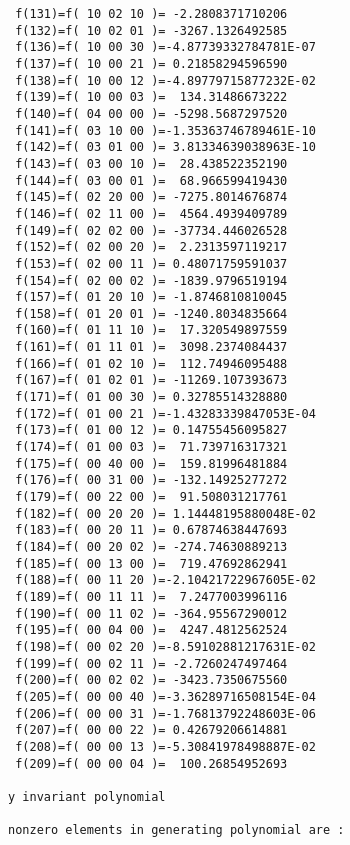 \begin{footnotesize}
\begin{verbatim}
 f(131)=f( 10 02 10 )= -2.2808371710206
 f(132)=f( 10 02 01 )= -3267.1326492585
 f(136)=f( 10 00 30 )=-4.87739332784781E-07
 f(137)=f( 10 00 21 )= 0.21858294596590
 f(138)=f( 10 00 12 )=-4.89779715877232E-02
 f(139)=f( 10 00 03 )=  134.31486673222
 f(140)=f( 04 00 00 )= -5298.5687297520
 f(141)=f( 03 10 00 )=-1.35363746789461E-10
 f(142)=f( 03 01 00 )= 3.81334639038963E-10
 f(143)=f( 03 00 10 )=  28.438522352190
 f(144)=f( 03 00 01 )=  68.966599419430
 f(145)=f( 02 20 00 )= -7275.8014676874
 f(146)=f( 02 11 00 )=  4564.4939409789
 f(149)=f( 02 02 00 )= -37734.446026528
 f(152)=f( 02 00 20 )=  2.2313597119217
 f(153)=f( 02 00 11 )= 0.48071759591037
 f(154)=f( 02 00 02 )= -1839.9796519194
 f(157)=f( 01 20 10 )= -1.8746810810045
 f(158)=f( 01 20 01 )= -1240.8034835664
 f(160)=f( 01 11 10 )=  17.320549897559
 f(161)=f( 01 11 01 )=  3098.2374084437
 f(166)=f( 01 02 10 )=  112.74946095488
 f(167)=f( 01 02 01 )= -11269.107393673
 f(171)=f( 01 00 30 )= 0.32785514328880
 f(172)=f( 01 00 21 )=-1.43283339847053E-04
 f(173)=f( 01 00 12 )= 0.14755456095827
 f(174)=f( 01 00 03 )=  71.739716317321
 f(175)=f( 00 40 00 )=  159.81996481884
 f(176)=f( 00 31 00 )= -132.14925277272
 f(179)=f( 00 22 00 )=  91.508031217761
 f(182)=f( 00 20 20 )= 1.14448195880048E-02
 f(183)=f( 00 20 11 )= 0.67874638447693
 f(184)=f( 00 20 02 )= -274.74630889213
 f(185)=f( 00 13 00 )=  719.47692862941
 f(188)=f( 00 11 20 )=-2.10421722967605E-02
 f(189)=f( 00 11 11 )=  7.2477003996116
 f(190)=f( 00 11 02 )= -364.95567290012
 f(195)=f( 00 04 00 )=  4247.4812562524
 f(198)=f( 00 02 20 )=-8.59102881217631E-02
 f(199)=f( 00 02 11 )= -2.7260247497464
 f(200)=f( 00 02 02 )= -3423.7350675560
 f(205)=f( 00 00 40 )=-3.36289716508154E-04
 f(206)=f( 00 00 31 )=-1.76813792248603E-06
 f(207)=f( 00 00 22 )= 0.42679206614881
 f(208)=f( 00 00 13 )=-5.30841978498887E-02
 f(209)=f( 00 00 04 )=  100.26854952693

y invariant polynomial

nonzero elements in generating polynomial are :


\end{verbatim}
\end{footnotesize}
